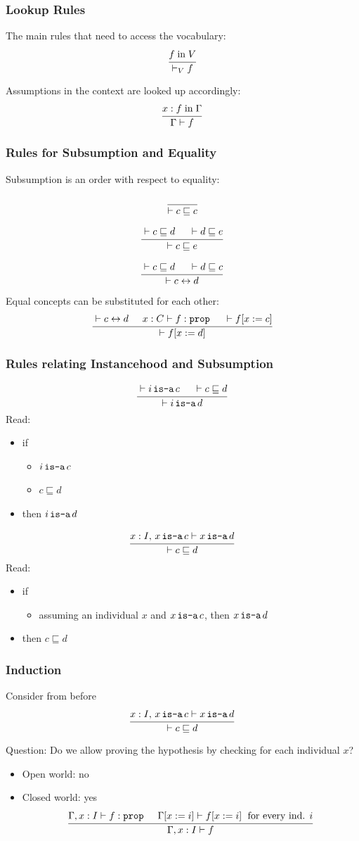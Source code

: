 \begin{frame}\frametitle{Lookup Rules}
The main rules that need to access the vocabulary:
\[\cfrac{f\;\mathrm{in}\; V}{\vdash_V f}\,\]
\medskip

Assumptions in the context are looked up accordingly:
\[\cfrac{x:f\;\mathrm{in}\; \Gamma}{\Gamma\vdash f}\,\]
\end{frame}

\begin{frame}\frametitle{Rules for Subsumption and Equality}
Subsumption is an order with respect to equality:
\[\cfrac{}{\vdash c\sqsubseteq c}\,\]

\[\cfrac{\vdash c\sqsubseteq d \hspace*{.5cm} \vdash d\sqsubseteq e}{\vdash c\sqsubseteq e}\,\]

\[\rul{\vdash c\sqsubseteq d \tb \vdash d\sqsubseteq c}{\vdash c\Equiv d}\]

Equal concepts can be substituted for each other:
\[\rul{\vdash c\Equiv d\tb x:C\vdash f:\prop\tb \vdash f[x := c]}{\vdash f[x := d]}\]

\end{frame}

\begin{frame}\frametitle{Rules relating Instancehood and Subsumption}
\[\cfrac{\vdash i\mathop{\texttt{is-a}} c \hspace*{.5cm} \vdash c\sqsubseteq d}{\vdash i\mathop{\texttt{is-a}} d}\,\]
Read:
\begin{itemize}
\item if
 \begin{itemize}
 \item $i\mathop{\texttt{is-a}} c$
 \item $c\sqsubseteq d$
 \end{itemize}
\item then $i\mathop{\texttt{is-a}} d$
\end{itemize}

\[\cfrac{x:I,\,x\mathop{\texttt{is-a}} c\vdash x\mathop{\texttt{is-a}} d}{\vdash c\sqsubseteq d}\,\]
Read:
\begin{itemize}
\item if
 \begin{itemize}
 \item assuming an individual $x$ and $x\mathop{\texttt{is-a}} c$, then $x\mathop{\texttt{is-a}} d$
 \end{itemize}
\item then $c\sqsubseteq d$
\end{itemize}
\end{frame}

\begin{frame}\frametitle{Induction}
Consider from before
\[\cfrac{x:I,\,x\mathop{\texttt{is-a}} c\vdash x\mathop{\texttt{is-a}} d}{\vdash c\sqsubseteq d}\,\]

Question: Do we allow proving the hypothesis by checking for each individual $x$?
\begin{itemize}
\item<2-> Open world: no
\item<3-> Closed world: yes
 \[\cfrac{\Gamma,x:I \vdash f:\mathtt{prop}\hspace*{.5cm}\Gamma[x:=i]\vdash f[x:=i] \;\text{ for every ind. } i}{\Gamma, x:I\vdash f}\,\]
\end{itemize}
\end{frame}

